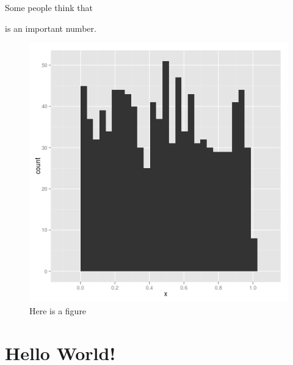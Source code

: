 \documentclass[11pt]{article}
\begin{document}
 

Some people think that 

is an important number. 

\begin{figure}[h]
  \centering
  \includegraphics[scale=1]{./plots/hist.png}
  \caption{Here is a figure}
  \label{fig:hist}
\end{figure}


\section{Hello World!}




\end{document}
